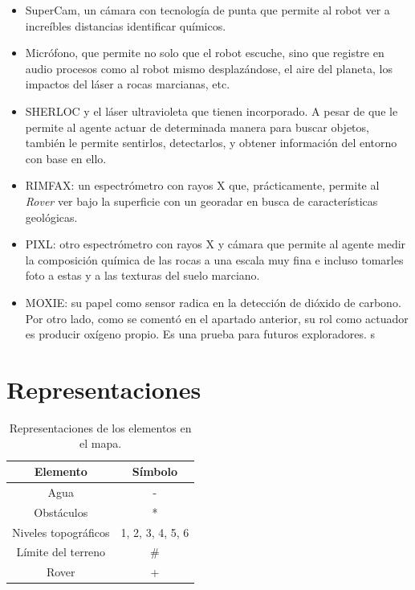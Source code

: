 \documentclass[12pt, letterpaper]{article}
\begin{document}
        \begin{itemize}

            \item SuperCam\cite{maurice2021supercam}, un cámara con tecnología de punta que permite al robot ver a increíbles distancias identificar químicos.
            \item Micrófono, que permite no solo que el robot escuche, sino que registre en audio procesos como al robot mismo desplazándose, el aire del planeta, los impactos del láser a rocas marcianas, etc.\cite{leighton2021thoughts}
            \item SHERLOC\cite{beegle2016sherloc} y el láser ultravioleta que tienen incorporado. A pesar de que le permite al agente actuar de determinada manera para buscar objetos, también le permite sentirlos, detectarlos, y obtener información del entorno con base en ello.
            \item RIMFAX\cite{hamran2015rimfax}: un espectrómetro con rayos X que, prácticamente, permite al \textit{Rover} ver bajo la superficie con un georadar en busca de características geológicas.
            \item PIXL\cite{allwood2021pixl}: otro espectrómetro con rayos X y cámara que permite al agente medir la composición química de las rocas a una escala muy fina e incluso tomarles foto a estas y a las texturas del suelo marciano.
            \item MOXIE: su papel como sensor radica en la detección de dióxido de carbono. Por otro lado, como se comentó en el apartado anterior, su rol como actuador es producir oxígeno propio. Es una prueba para futuros exploradores.
        s
        \end{itemize}

\section{Representaciones}

    \begin{table}[h!]
        \centering
        \begin{tabular}{|c|c|} %
            \hline %
            \textbf{Elemento} & \textbf{Símbolo} \\
            \hline %
            Agua & -\\
            \hline %
            Obstáculos & * \\
            \hline %
            Niveles topográficos & 1, 2, 3, 4, 5, 6 \\
            \hline %
            Límite del terreno & \# \\
            \hline %
            Rover & + \\
            \hline %
        \end{tabular}
        \caption{Representaciones de los elementos en el mapa.}
        \label{tabla:representaciones}
    \end{table}
\end{document}
